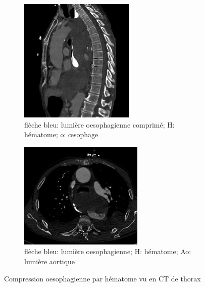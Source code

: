 \documentclass[./tfe]{subfiles}
\begin{document}
\begin{figure}[!h]
    \centering
    \begin{subfigure}[b]{.5\textwidth}
        \includegraphics[width=.9\textwidth]{images/ct_compression_oesophagienne.jpg}
        \caption{flèche bleu: lumière oesophagienne comprimé; H: hématome; o: œsophage}
        \label{subfig:ct_1}
    \end{subfigure}%
%
    \begin{subfigure}[b]{.5\textwidth}
        \includegraphics[width=.9\textwidth]{images/ct_lumieres_oesophagienne_et_aortique.jpg}
        \caption{flèche bleu: lumière oesophagienne; H: hématome; Ao: lumière aortique}
        \label{subfig:ct_2}
    \end{subfigure}
    
    \caption{Compression oesophagienne par hématome vu en CT de thorax}
    \label{fig:ct_thorax}
\end{figure}
\end{document}

